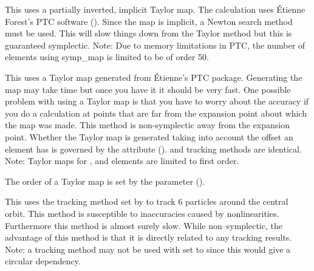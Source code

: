 \begin{description}
\item[\vn{Symp_Map}]
This uses a partially inverted, implicit Taylor map. The calculation
uses \'Etienne Forest's PTC software ().  Since the map is implicit, a Newton
search method must be used. This will slow things down from the Taylor
method but this is guaranteed symplectic. Note: Due to memory limitations
in PTC, the number of elements using symp_map is limited to be of order 50.

\item[\vn{Taylor}]
This uses a Taylor map generated from \'Etienne's PTC
package. Generating the map may take time but once you have it it
should be very fast. One possible problem with using a Taylor map is
that you have to worry about the accuracy if you do a calculation at
points that are far from the expansion point about which the map was
made. This method is non-symplectic away from the expansion
point. Whether the Taylor map is generated taking into account the
offset an element has is governed by the 
attribute ().  and 
tracking methods are identical. Note: Taylor maps for , and
 elements are limited to first order.

The order of a Taylor map is set by the 
parameter ().

\item[\vn{Tracking}]
This uses the tracking method set by  to track 6 particles around the central
orbit. This method is susceptible to inaccuracies caused by nonlinearities. Furthermore this method
is almost surely slow. While non--symplectic, the advantage of this method is that it is directly
related to any tracking results. Note: a  tracking method may not be used with
 set to  since this would give a circular dependency.

\end{description}

